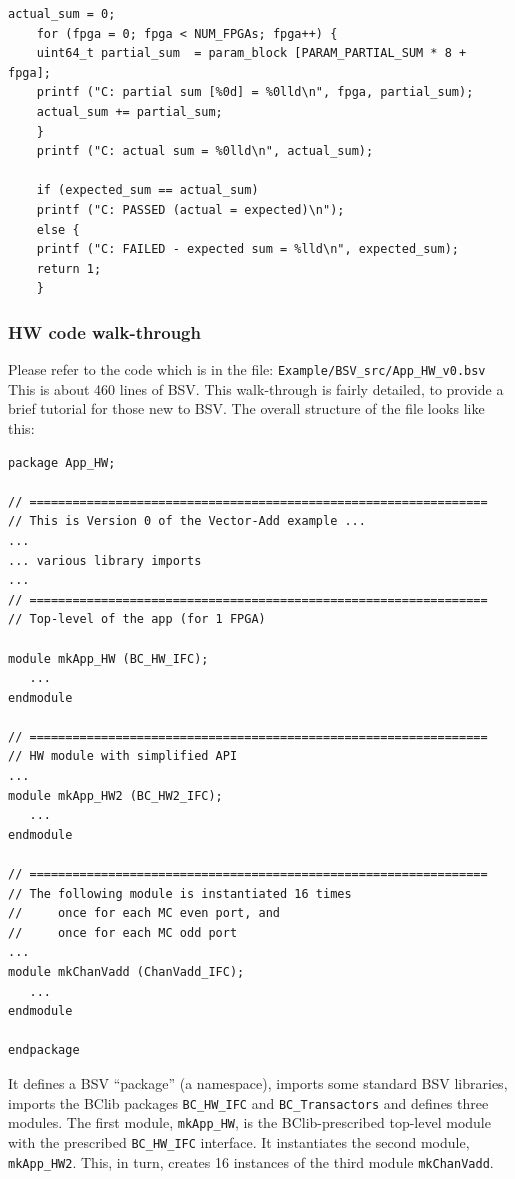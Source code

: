 \documentclass[twoside,letterpaper,11pt]{article}
\newcommand{\hm}{\hspace*{1em}}
\begin{document}
\begin{Verbatim}[frame=single, label=App\_SW.c]  
    actual_sum = 0;
    for (fpga = 0; fpga < NUM_FPGAs; fpga++) {
	uint64_t partial_sum  = param_block [PARAM_PARTIAL_SUM * 8 + fpga];
	printf ("C: partial sum [%0d] = %0lld\n", fpga, partial_sum);
	actual_sum += partial_sum;
    }
    printf ("C: actual sum = %0lld\n", actual_sum);

    if (expected_sum == actual_sum)
	printf ("C: PASSED (actual = expected)\n");
    else {
	printf ("C: FAILED - expected sum = %lld\n", expected_sum);
	return 1;
    }
\end{Verbatim}


\subsubsection{HW code walk-through}

\label{sec_HW_code_walk_through}

Please refer to the code which is in the file: \hm \verb|Example/BSV_src/App_HW_v0.bsv| \\
This is about 460 lines of BSV.  This walk-through is fairly detailed,
to provide a brief tutorial for those new to BSV.  The overall
structure of the file looks like this:

\begin{Verbatim}[frame=single, label=App\_HW\_v0.bsv]
package App_HW;

// ================================================================
// This is Version 0 of the Vector-Add example ...
...
... various library imports
...
// ================================================================
// Top-level of the app (for 1 FPGA)

module mkApp_HW (BC_HW_IFC);
   ...
endmodule

// ================================================================
// HW module with simplified API
...
module mkApp_HW2 (BC_HW2_IFC);
   ...
endmodule

// ================================================================
// The following module is instantiated 16 times
//     once for each MC even port, and
//     once for each MC odd port
...
module mkChanVadd (ChanVadd_IFC);
   ...
endmodule

endpackage
\end{Verbatim}
It defines a BSV ``package'' (a namespace), imports some standard BSV
libraries, imports the BClib packages \verb|BC_HW_IFC| and
\verb|BC_Transactors| and defines three modules.  The first module,
\verb|mkApp_HW|, is the BClib-prescribed top-level module with the
prescribed \verb|BC_HW_IFC| interface.  It instantiates the second
module, \verb|mkApp_HW2|.  This, in turn, creates 16 instances of the
third module \verb|mkChanVadd|.
\end{document}
